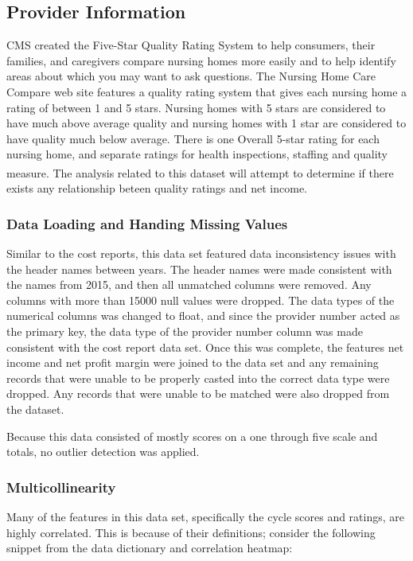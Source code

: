 \documentclass{article}
\theoremstyle{mytheoremstyle}
\theoremstyle{mytheoremstyle}
\theoremstyle{myproblemstyle}
\begin{document}
\subsection{Provider Information}
CMS created the Five-Star Quality Rating System to help consumers, their families, and caregivers compare nursing homes more easily and to help identify areas about which you may want to ask questions.  The Nursing Home Care Compare web site features a quality rating system that gives each nursing home a rating of between 1 and 5 stars.  Nursing homes with 5 stars are considered to have much above average quality and nursing homes with 1 star are considered to have quality much below average.  There is one Overall 5-star rating for each nursing home, and separate ratings for health inspections, staffing and quality measure\textsuperscript{\cite{cmsfive2023}}\textsuperscript{\cite{provCMS}}. The analysis related to this dataset will attempt to determine if there exists any relationship beteen quality ratings and net income.

\subsubsection{Data Loading and Handing Missing Values}
Similar to the cost reports, this data set featured data inconsistency issues with the header names between years. The header names were made consistent with the names from 2015, and then all unmatched columns were removed. Any columns with more than 15000 null values were dropped. The data types of the numerical columns was changed to float, and since the provider number acted as the primary key, the data type of the provider number column was made consistent with the cost report data set. Once this was complete, the features net income and net profit margin were joined to the data set and any remaining records that were unable to be properly casted into the correct data type were dropped. Any records that were unable to be matched were also dropped from the dataset.

Because this data consisted of mostly scores on a one through five scale and totals, no outlier detection was applied. 

\subsubsection{Multicollinearity}
Many of the features in this data set, specifically the cycle scores and ratings, are highly correlated. This is because of their definitions; consider the following snippet from the data dictionary and correlation heatmap:
\end{document}
